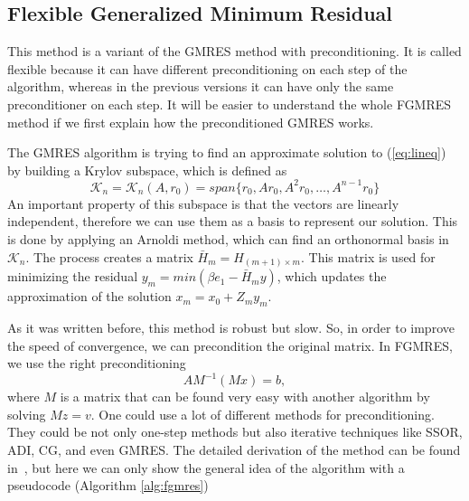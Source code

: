 \subsection{Flexible Generalized Minimum Residual}

This method is a variant of the GMRES method with preconditioning. It is called flexible because it can have different preconditioning on each step of the algorithm, whereas in the previous versions it can have only the same preconditioner on each step. It will be easier to understand the whole FGMRES method if we first explain how the preconditioned GMRES works.

The GMRES algorithm is trying to find an approximate solution to (\cref{eq:lineq}) by building a Krylov subspace, which is defined as
\begin{equation}
    \mathcal{K}_n = \mathcal{K}_n (A, r_0) = span \{ r_0, Ar_0, A^2r_0,\hdots, A^{n-1}r_0 \}
\end{equation}
An important property of this subspace is that the vectors are linearly independent, therefore we can use them as a basis to represent our solution. This is done by applying an Arnoldi method, which can find an orthonormal basis in $\mathcal{K}_n$. The process creates a matrix $\bar{H}_m = H_{(m+1)\times m}$. This matrix is used for minimizing the residual $y_m = min(\beta e_1 - \bar{H}_m y)$, which updates the approximation of the solution $x_m = x_0 + Z_my_m$.

As it was written before, this method is robust but slow. So, in order to improve the speed of convergence, we can precondition the original matrix. In FGMRES, we use the right preconditioning
\begin{equation}
    AM^{-1}(Mx) = b,
\end{equation}
where $M$ is a matrix that can be found very easy with another algorithm by solving $Mz = v$. One could use a lot of different methods for preconditioning. They could be not only one-step methods but also iterative techniques like SSOR, ADI, CG, and even GMRES. The detailed derivation of the method can be found in~\cite{fgmresart}, but here we can only show the general idea of the algorithm with a pseudocode (Algorithm \cref{alg:fgmres})

